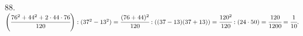 88. $\left(\cfrac{76^2+44^2+2\cdot44\cdot76}{120}\right):(37^2-13^2)=\cfrac{(76+44)^2}{120}:((37-13)(37+13))=\cfrac{120^2}{120}:(24\cdot50)=\cfrac{120}{1200}=\cfrac{1}{10}.$\\

